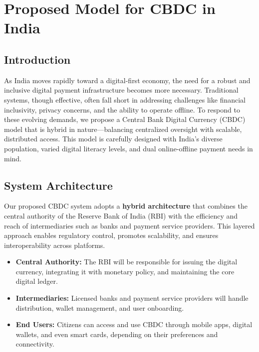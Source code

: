 %
\chapter{Proposed Model for CBDC in India}
\label{chp4}

\section{Introduction}
As India moves rapidly toward a digital-first economy, the need for a robust and inclusive digital payment infrastructure becomes more necessary. Traditional systems, though effective, often fall short in addressing challenges like financial inclusivity, privacy concerns, and the ability to operate offline. To respond to these evolving demands, we propose a Central Bank Digital Currency (CBDC) model that is hybrid in nature—balancing centralized oversight with scalable, distributed access. This model is carefully designed with India’s diverse population, varied digital literacy levels, and dual online-offline payment needs in mind.

\section{System Architecture}

Our proposed CBDC system adopts a \textbf{hybrid architecture} that combines the central authority of the Reserve Bank of India (RBI) with the efficiency and reach of intermediaries such as banks and payment service providers. This layered approach enables regulatory control, promotes scalability, and ensures interoperability across platforms.

\begin{itemize}
    \item \textbf{Central Authority:} The RBI will be responsible for issuing the digital currency, integrating it with monetary policy, and maintaining the core digital ledger.
    \item \textbf{Intermediaries:} Licensed banks and payment service providers will handle distribution, wallet management, and user onboarding.
    \item \textbf{End Users:} Citizens can access and use CBDC through mobile apps, digital wallets, and even smart cards, depending on their preferences and connectivity.
\end{itemize}

